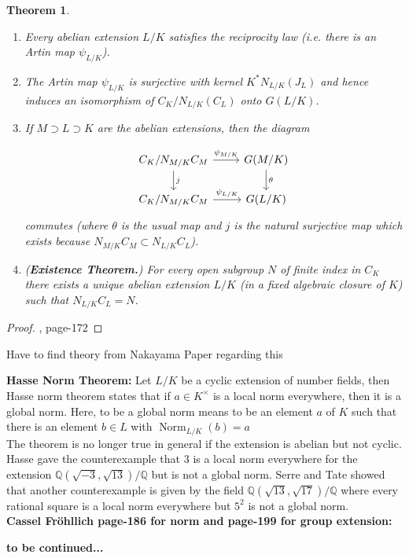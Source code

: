 \documentclass{article}
\theoremstyle{break}
\newtheorem{theorem}{Theorem}[section]
\def\Norm{\mathop{\mathrm{Norm}}\nolimits}
\begin{document}
\begin{theorem}
\begin{enumerate}
\item Every abelian extension $L/K$ satisfies the reciprocity law (i.e. there is an Artin map $\psi_{L/K}$).
\item The Artin map $\psi_{L/K}$ is surjective with kernel $K^{*}N_{L/K}(J_{L})$ and hence induces an isomorphism of $C_{K}/N_{L/K}(C_L)$ onto $G(L/K)$.
\item If $M\supset L\supset K $ are the abelian extensions, then the diagram

\[\begin{tikzcd}
C_K/N_{M/K}C_M\arrow{d}{j}\arrow{r}{\psi_{M/K}} & G(M/K)\arrow{d}{\theta}\\
C_K/N_{M/K}C_M\arrow{r}{\psi_{L/K}} &
G(L/K)
\end{tikzcd}\]
commutes (where $\theta$ is the usual map and $j$ is the natural surjective map which exists because $N_{M/K}C_M \subset N_{L/K}C_L$).
\item (\textbf{Existence Theorem.}) For every open subgroup $N$ of finite index in $C_K$ there exists a unique abelian extension $L/K$ (in a fixed algebraic closure of $K$) such that $N_{L/K} C_L = N$.


 \end{enumerate}
\end{theorem}
\begin{proof}
\cite{Cassels}, page-172
\end{proof}

{\color{red}Have to find theory from Nakayama Paper regarding this}




\textbf{Hasse Norm Theorem:}
Let  $L/K$ be a cyclic extension of number fields, then Hasse norm theorem states that if $a\in K^{\times}$ is a local norm everywhere, then it is a global norm. {\color{blue}Here, to be a global norm means to be an element $a$ of $K$ such that there is an element $b \in L$ with $\Norm_{L/K} ( b ) = a$} \\
The theorem is no longer true in general if the extension is abelian but not cyclic. Hasse gave the counterexample that $3$ is a local norm everywhere for the extension $\mathbb{Q}( \sqrt {-3},\sqrt {13} ) / \mathbb{Q}$ but is not a global norm. Serre and Tate showed that another counterexample is given by the field $\mathbb{Q}({\sqrt{13},\sqrt{17}})/ \mathbb{Q}$  where every rational square is a local norm everywhere but $5^2$ is not a global norm.\\ 
\textbf{Cassel Fr\"ohllich page-186 for norm  and page-199 for group extension:}




\textbf{to be continued...}
\end{document}
